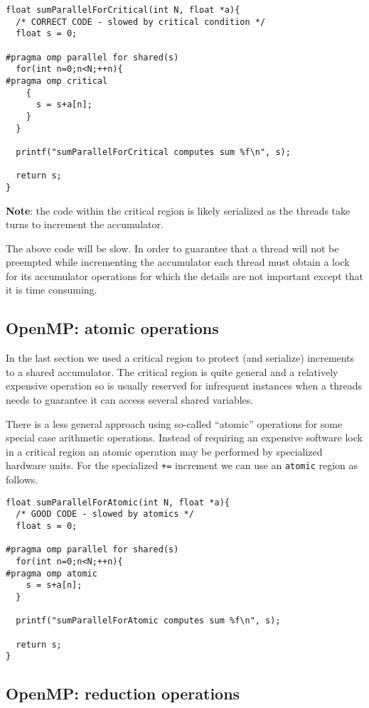 \begin{verbatim}
float sumParallelForCritical(int N, float *a){
  /* CORRECT CODE - slowed by critical condition */
  float s = 0;

#pragma omp parallel for shared(s)
  for(int n=0;n<N;++n){
#pragma omp critical
    {
      s = s+a[n];
    }
  }

  printf("sumParallelForCritical computes sum %f\n", s);

  return s;
}
\end{verbatim}

{\bf Note}: the code within the critical region is likely serialized as the threads take turns to increment the accumulator.

The above code will be slow. In order to guarantee that a thread will not be preempted while incrementing the accumulator each thread must obtain a lock for its accumulator operations for which the details are not important except that it is time consuming.

\subsection{OpenMP: atomic operations}

In the last section we used a critical region to protect (and serialize) increments to a shared accumulator. The critical region is quite general and a relatively expensive operation so is usually reserved for infrequent instances when a threads needs to guarantee it can access several shared variables.

There is a less general approach using so-called ``atomic''  operations for some special case arithmetic operations. Instead of requiring an expensive software lock in a critical region an atomic operation may be performed by specialized hardware units. For the specialized \texttt{+=} increment we can use an \texttt{atomic} region as follows. 

\begin{verbatim}
float sumParallelForAtomic(int N, float *a){
  /* GOOD CODE - slowed by atomics */
  float s = 0;

#pragma omp parallel for shared(s)
  for(int n=0;n<N;++n){
#pragma omp atomic
    s = s+a[n];
  }

  printf("sumParallelForAtomic computes sum %f\n", s);

  return s;
}
\end{verbatim}

\subsection{OpenMP: reduction operations}

